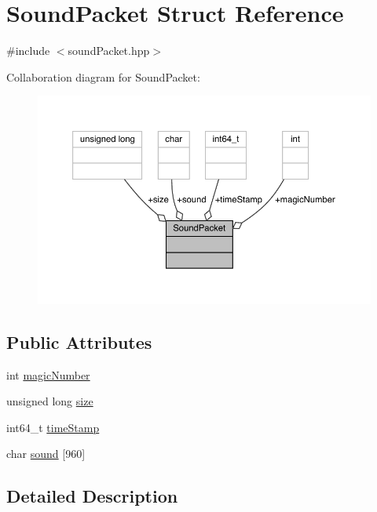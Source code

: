 \hypertarget{struct_sound_packet}{}\section{Sound\+Packet Struct Reference}
\label{struct_sound_packet}


{\ttfamily \#include $<$sound\+Packet.\+hpp$>$}



Collaboration diagram for Sound\+Packet\+:\nopagebreak
\begin{figure}[H]
\begin{center}
\leavevmode
\includegraphics[width=350pt]{struct_sound_packet__coll__graph}
\end{center}
\end{figure}
\subsection*{Public Attributes}
\begin{DoxyCompactItemize}
\item 
int \mbox{\hyperlink{struct_sound_packet_a3847f18db4f82ef66b4823e19a9436ee}{magic\+Number}}
\item 
unsigned long \mbox{\hyperlink{struct_sound_packet_a47ab19973aebdbb8cec71c03fc61ec9b}{size}}
\item 
int64\+\_\+t \mbox{\hyperlink{struct_sound_packet_a7db1b25b84d9bfc40055b70e944cbc93}{time\+Stamp}}
\item 
char \mbox{\hyperlink{struct_sound_packet_a09f457e6f2623e33c1eb6b38b67f7a75}{sound}} \mbox{[}960\mbox{]}
\end{DoxyCompactItemize}


\subsection{Detailed Description}


